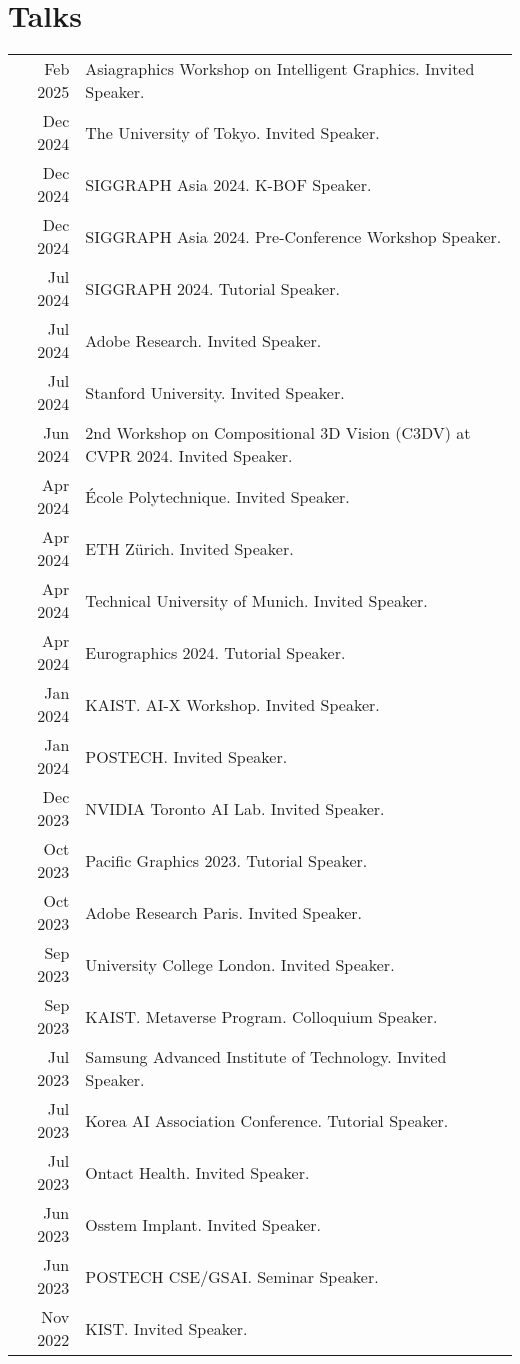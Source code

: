 \documentclass[letterpaper,10pt]{article} %
\begin{document}
{{\section{Talks}
\begin{tabular}{r|p{11cm}}
Feb 2025 & Asiagraphics Workshop on Intelligent Graphics. Invited Speaker.\\
Dec 2024 & The University of Tokyo. Invited Speaker.\\
Dec 2024 & SIGGRAPH Asia 2024. K-BOF Speaker.\\
Dec 2024 & SIGGRAPH Asia 2024. Pre-Conference Workshop Speaker.\\
Jul 2024 & SIGGRAPH 2024. Tutorial Speaker.\\
Jul 2024 & Adobe Research. Invited Speaker.\\
Jul 2024 & Stanford University. Invited Speaker.\\
Jun 2024 & 2nd Workshop on Compositional 3D Vision (C3DV) at CVPR 2024. Invited Speaker.\\
Apr 2024 & \'Ecole Polytechnique. Invited Speaker.\\
Apr 2024 & ETH Z\"urich. Invited Speaker.\\
Apr 2024 & Technical University of Munich. Invited Speaker.\\
Apr 2024 & Eurographics 2024. Tutorial Speaker.\\
Jan 2024 & KAIST. AI-X Workshop. Invited Speaker.\\
Jan 2024 & POSTECH. Invited Speaker.\\
Dec 2023 & NVIDIA Toronto AI Lab. Invited Speaker.\\
Oct 2023 & Pacific Graphics 2023. Tutorial Speaker.\\
Oct 2023 & Adobe Research Paris. Invited Speaker.\\
Sep 2023 & University College London. Invited Speaker.\\
Sep 2023 & KAIST. Metaverse Program. Colloquium Speaker.\\
Jul 2023 & Samsung Advanced Institute of Technology. Invited Speaker.\\
Jul 2023 & Korea AI Association Conference. Tutorial Speaker.\\
Jul 2023 & Ontact Health. Invited Speaker.\\
Jun 2023 & Osstem Implant. Invited Speaker.\\
Jun 2023 & POSTECH CSE/GSAI. Seminar Speaker.\\
Nov 2022 & KIST. Invited Speaker.\\

\end{tabular}}}
\end{document}
